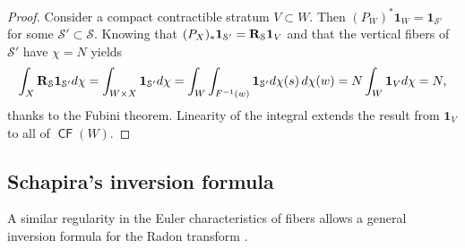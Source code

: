 \documentclass{psapm-l}
\theoremstyle{definition}
\theoremstyle{remark}
\numberwithin{equation}{section}
\begin{document}
\begin{proof}
Consider a compact contractible stratum $V\subset W$. Then $(P_W)^*{{\mathbf{1}}}_W={{\mathbf{1}}}_{{{\mathcal S}}'}$ for some ${{\mathcal S}}'\subset{{\mathcal S}}$. Knowing that $(P_X)_*{{\mathbf{1}}}_{{{\mathcal S}}'}={{\bf R}}_{{\mathcal S}}{{\mathbf{1}}}_{V}$ and that the vertical fibers of ${{\mathcal S}}'$ have $\chi=N$ yields
\[
    \int_X{{\bf R}}_{{\mathcal S}}{{\mathbf{1}}}_{{{\mathcal S}}'}d\chi
    = \int_{W\times X}{{\mathbf{1}}}_{{{\mathcal S}}'}d\chi
    = \int_W\int_{F{^{-1}}(w)}{{\mathbf{1}}}_{{{\mathcal S}}'}d\chi(s)\,d\chi(w)
    = N\int_W{{\mathbf{1}}}_Vd\chi = N ,
\]
thanks to the Fubini theorem. Linearity of the integral extends the result from ${{\mathbf{1}}}_V$ to all of ${{{\operatorname{\mathsf{{CF}}}}}}(W)$.
\end{proof}

\subsection{Schapira's inversion formula}
\label{sec:inversion}

A similar regularity in the Euler characteristics of fibers allows a general inversion formula for the Radon transform \cite{Schapira:tom}.
\end{document}

